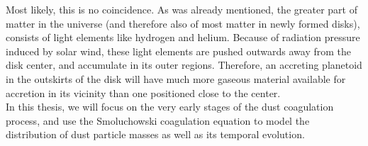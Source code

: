    Most likely, this is no coincidence. 
    As was already mentioned, the greater part of matter in the universe 
    (and therefore also of most matter in newly formed disks), 
    consists of light elements like hydrogen and helium. 
    Because of radiation pressure induced by solar wind, these light elements are pushed outwards 
    away from the disk center, and accumulate in its outer regions. 
    Therefore, an accreting planetoid in the outskirts of the disk will have much more gaseous
    material available for accretion in its vicinity than one positioned close to the center. \\

    In this thesis, we will focus on the very early stages of the dust coagulation process, 
    and use the Smoluchowski coagulation equation to model the distribution 
    of dust particle masses as well as its temporal evolution. \\







